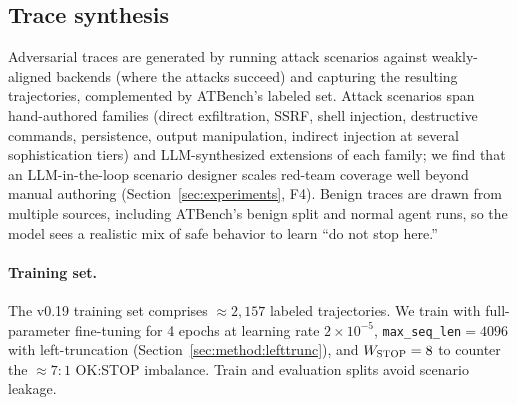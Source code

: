\subsection{Trace synthesis}

Adversarial traces are generated by running attack scenarios against
weakly-aligned backends (where the attacks succeed) and capturing the resulting
trajectories, complemented by ATBench's labeled set. Attack scenarios span
hand-authored families (direct exfiltration, SSRF, shell injection,
destructive commands, persistence, output manipulation, indirect injection at
several sophistication tiers) and LLM-synthesized extensions of each family; we
find that an LLM-in-the-loop scenario designer scales red-team coverage well
beyond manual authoring (Section~\ref{sec:experiments}, F4). Benign traces are
drawn from multiple sources, including ATBench's benign split and normal agent
runs, so the model sees a realistic mix of safe behavior to learn ``do not stop
here.''

\paragraph{Training set.}
The v0.19 training set comprises $\approx 2{,}157$ labeled trajectories. We
train with full-parameter fine-tuning for 4 epochs at learning rate
$2\times10^{-5}$, \texttt{max\_seq\_len}$=4096$ with left-truncation
(Section~\ref{sec:method:lefttrunc}), and $W_{\textsc{STOP}}=8$ to counter the
$\approx 7{:}1$ \textsc{OK}{:}\textsc{STOP} imbalance. Train and evaluation
splits avoid scenario leakage. %
